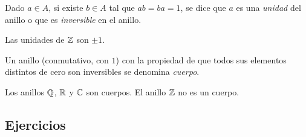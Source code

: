 \begin{defEuclidianos}\label{def:euclidianos:unidades}
	Dado $a\in A$, si existe $b\in A$ tal que $ab=ba=1$, se dice que $a$
	es una \emph{unidad} del anillo o que es \emph{inversible} en el
	anillo.
\end{defEuclidianos}

\begin{ejemEuclidianos}\label{ejem:euclidianos:unidades}
	Las unidades de $\mathbb{Z}$ son $\pm 1$.
\end{ejemEuclidianos}

\begin{defEuclidianos}\label{def:euclidianos:cuerpo}
	Un anillo (conmutativo, con $1$) con la propiedad de que todos sus
	elementos distintos de cero son inversibles se denomina \emph{cuerpo}.
\end{defEuclidianos}

\begin{ejemEuclidianos}\label{ejem:euclidianos:cuerpo}
	Los anillos $\mathbb{Q}$, $\mathbb{R}$ y $\mathbb{C}$ son cuerpos.
	El anillo $\mathbb{Z}$ no es un cuerpo.
\end{ejemEuclidianos}

\subsection*{Ejercicios}


